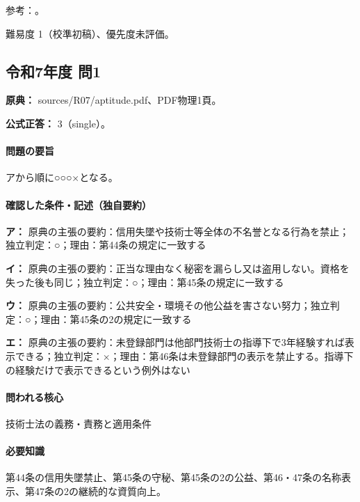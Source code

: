 \par 参考：\cite{engineer_act_current}。

\par 難易度 1（校準初稿）、優先度未評価。

\subsection{令和7年度 問1}
\label{q:r07-reg-apt-01}

\noindent\textbf{原典：} sources/R07/aptitude.pdf、PDF物理1頁。

\textbf{公式正答：} 3（single）。

\paragraph{問題の要旨} アから順に○○○×となる。

\paragraph{確認した条件・記述（独自要約）}\mbox{}\par

\noindent\textbf{ア：} 原典の主張の要約：信用失墜や技術士等全体の不名誉となる行為を禁止；独立判定：○；理由：第44条の規定に一致する\par

\noindent\textbf{イ：} 原典の主張の要約：正当な理由なく秘密を漏らし又は盗用しない。資格を失った後も同じ；独立判定：○；理由：第45条の規定に一致する\par

\noindent\textbf{ウ：} 原典の主張の要約：公共安全・環境その他公益を害さない努力；独立判定：○；理由：第45条の2の規定に一致する\par

\noindent\textbf{エ：} 原典の主張の要約：未登録部門は他部門技術士の指導下で3年経験すれば表示できる；独立判定：×；理由：第46条は未登録部門の表示を禁止する。指導下の経験だけで表示できるという例外はない\par

\paragraph{問われる核心} 技術士法の義務・責務と適用条件

\paragraph{必要知識} 第44条の信用失墜禁止、第45条の守秘、第45条の2の公益、第46・47条の名称表示、第47条の2の継続的な資質向上。

